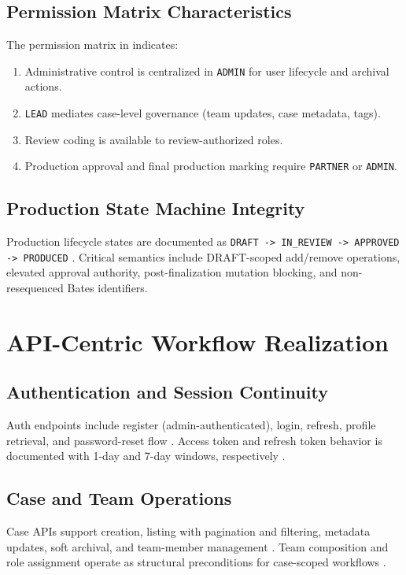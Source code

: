 \documentclass[conference]{IEEEtran}
\begin{document}
\subsection{Permission Matrix Characteristics}
The permission matrix in \cite{roles} indicates:
\begin{enumerate}
\item Administrative control is centralized in \texttt{ADMIN} for user lifecycle and archival actions.
\item \texttt{LEAD} mediates case-level governance (team updates, case metadata, tags).
\item Review coding is available to review-authorized roles.
\item Production approval and final production marking require \texttt{PARTNER} or \texttt{ADMIN}.
\end{enumerate}

\subsection{Production State Machine Integrity}
Production lifecycle states are documented as \texttt{DRAFT -> IN\_REVIEW -> APPROVED -> PRODUCED} \cite{roles}. Critical semantics include DRAFT-scoped add/remove operations, elevated approval authority, post-finalization mutation blocking, and non-resequenced Bates identifiers.

\section{API-Centric Workflow Realization}
\subsection{Authentication and Session Continuity}
Auth endpoints include register (admin-authenticated), login, refresh, profile retrieval, and password-reset flow \cite{api}. Access token and refresh token behavior is documented with 1-day and 7-day windows, respectively \cite{arch,api}.

\subsection{Case and Team Operations}
Case APIs support creation, listing with pagination and filtering, metadata updates, soft archival, and team-member management \cite{api}. Team composition and role assignment operate as structural preconditions for case-scoped workflows \cite{api,roles}.
\end{document}
